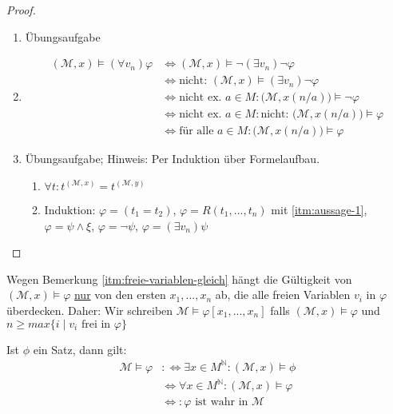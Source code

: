 \documentclass{article}
\theoremstyle{definition}
\newcommand{\calM}{\mathcal{M}}
\begin{document}
    \begin{proof}
        ~\par
        \begin{enumerate}
            \item Übungsaufgabe
            \item \begin{align*}
                (\calM, x) \models (\forall v_n) \varphi & \Leftrightarrow (\calM, x) \models \neg (\exists v_n) \neg \varphi \\
                & \Leftrightarrow \text{nicht: } (\calM, x) \models (\exists v_n) \neg \varphi \\
                & \Leftrightarrow \text{nicht ex. } a \in M: \big(\calM, x(n/a)\big) \models \neg \varphi \\
                & \Leftrightarrow \text{nicht ex. } a \in M: \text{nicht: } \big(\calM, x(n/a)\big) \models \varphi \\
                & \Leftrightarrow \text{für alle } a \in M: \big(\calM, x(n/a)\big) \models \varphi
            \end{align*}
            \item Übungsaufgabe; Hinweis: Per Induktion über Formelaufbau.
            \begin{enumerate}
                \item $ \forall t: t^{(\calM, x)} = t^{(\calM, y)} $ \label{itm:aussage-1}
                \item Induktion: $ \varphi = (t_1 = t_2) $, $ \varphi = R(t_1, ..., t_n) $ mit \ref{itm:aussage-1}, $ \varphi = \psi \land \xi $, $ \varphi = \neg \psi $, $ \varphi = (\exists v_n) \psi $
            \end{enumerate}
        \end{enumerate}
    \end{proof}

    Wegen Bemerkung \ref{itm:freie-variablen-gleich} hängt die Gültigkeit von $ (\calM, x) \models \varphi $ \underline{nur} von den ersten $ x_1, ..., x_n $ ab, die alle freien Variablen $ v_i $ in $ \varphi $ überdecken.
    Daher: Wir schreiben $ \calM \models \varphi[x_1, ..., x_n] $ falls $ (\calM, x) \models \varphi $ und $ n \geq max\{i \mid v_i \text{ frei in } \varphi\} $

    Ist $ \phi $ ein Satz, dann gilt:
    \begin{align*}
        \calM \models \varphi & :\Leftrightarrow \exists x \in M^{\mathbb{N}}: (\calM, x) \models \phi \\
        & \Leftrightarrow \forall x \in M^\mathbb{N}: (\calM, x) \models \varphi \\
        & \Leftrightarrow: \varphi \text{ ist wahr in } \calM
    \end{align*}
\end{document}
